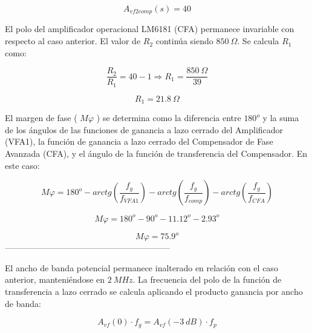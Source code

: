 \begin{equation}
    \boxed{
    A_{vf2 comp} (s) = 40
    }
\end{equation}

\hspace{1mm} El polo del amplificador operacional LM6181 (CFA) permanece invariable con respecto al caso anterior. El valor de \(R_2\) continúa siendo \(850~\Omega\). Se calcula \(R_1\) como:

\begin{equation}
    \frac{R_2}{R_1} = 40 - 1 \Longrightarrow R_1 = \frac{850~\Omega}{39}
\end{equation}

\begin{equation}
    \boxed{
    R_1 = 21.8~\Omega
    }
\end{equation}

\hspace{1mm} El margen de fase ( \(M\varphi\) ) se determina como la diferencia entre \(180^o\) y la suma de los ángulos de las funciones de ganancia a lazo cerrado del Amplificador (VFA1), la función de ganancia a lazo cerrado del Compensador de Fase Avanzada (CFA), y el ángulo de la función de transferencia del Compensador. En este caso:

\begin{equation}
    M\varphi = 180^o - arctg \left(  \frac{f_g}{f_{VFA1}}\right) - arctg \left( \frac{f_g}{f_{comp}} \right) - arctg \left( \frac{f_g}{f_{CFA}} \right)
\end{equation}

\begin{equation}
   M\varphi = 180^o - 90^o - 11.12^o - 2.93^o
\end{equation}

\begin{equation}
    \boxed{
    M\varphi = 75.9^o
    }
\end{equation}
-----------------------------------------------------------

\hspace{1mm} El ancho de banda potencial permanece inalterado en relación con el caso anterior, manteniéndose en \(2~MHz\). La frecuencia del polo de la función de transferencia a lazo cerrado se calcula aplicando el producto ganancia por ancho de banda:

\begin{equation}
    A_{vf} (0) \cdot f_g = A_{vf}(-3~dB) \cdot f_p
\end{equation}

